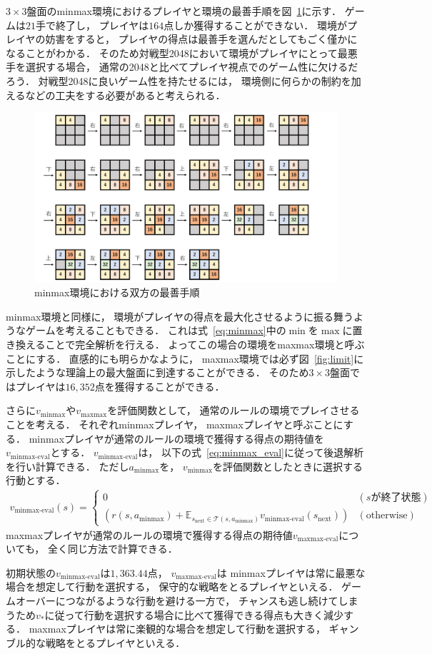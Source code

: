 $3\times3$盤面のminmax環境におけるプレイヤと環境の最善手順を図~\ref{fig:minmax_env}に示す．
ゲームは$21$手で終了し， プレイヤは$164$点しか獲得することができない．
環境がプレイヤの妨害をすると， プレイヤの得点は最善手を選んだとしてもごく僅かになることがわかる．
そのため対戦型2048において環境がプレイヤにとって最悪手を選択する場合， 通常の2048と比べてプレイヤ視点でのゲーム性に欠けるだろう．
対戦型2048に良いゲーム性を持たせるには， 環境側に何らかの制約を加えるなどの工夫をする必要があると考えられる．
\begin{figure}[t]
    \centering
    \includegraphics[width=\linewidth{}]{figures/minmax_transition.pdf}
    \caption{minmax環境における双方の最善手順}
    \label{fig:minmax_env}
\end{figure}

minmax環境と同様に， 環境がプレイヤの得点を最大化させるように振る舞うようなゲームを考えることもできる．
これは式~\ref{eq:minmax}中の$\min$を$\max$に置き換えることで完全解析を行える．
よってこの場合の環境をmaxmax環境と呼ぶことにする．
直感的にも明らかなように， maxmax環境では必ず図~\ref{fig:limit}に示したような理論上の最大盤面に到達することができる．
そのため$3\times3$盤面ではプレイヤは$16,352$点を獲得することができる．

さらに$v_{\text{minmax}}$や$v_{\text{maxmax}}$を評価関数として， 通常のルールの環境でプレイさせることを考える．
それぞれminmaxプレイヤ， maxmaxプレイヤと呼ぶことにする．
minmaxプレイヤが通常のルールの環境で獲得する得点の期待値を$v_{\text{minmax-eval}}$とする．
$v_{\text{minmax-eval}}$は， 以下の式~\ref{eq:minmax_eval}に従って後退解析を行い計算できる．
ただし$a_{\text{minmax}}$を， $v_{\text{minmax}}$を評価関数としたときに選択する行動とする．
\begin{align}
    v_{\text{minmax-eval}}(s) =
    \begin{cases}
        0 & (s \text{が終了状態}) \\
        \left(r(s, a_{\text{minmax}}) + \mathbb{E}_{s_\text{next} \in \mathcal{T}(s, a_{\text{minmax}})} v_{\text{minmax-eval}}(s_\text{next}) \right) & (\text{otherwise})
    \end{cases}
    \label{eq:minmax_eval}
\end{align}
maxmaxプレイヤが通常のルールの環境で獲得する得点の期待値$v_{\text{maxmax-eval}}$についても， 全く同じ方法で計算できる．

初期状態の$v_{\text{minmax-eval}}$は$1,363.44$点， $v_{\text{maxmax-eval}}$は
minmaxプレイヤは常に最悪な場合を想定して行動を選択する， 保守的な戦略をとるプレイヤといえる．
ゲームオーバーにつながるような行動を避ける一方で， チャンスも逃し続けてしまうため$v_*$に従って行動を選択する場合に比べて獲得できる得点も大きく減少する．
maxmaxプレイヤは常に楽観的な場合を想定して行動を選択する， ギャンブル的な戦略をとるプレイヤといえる．
